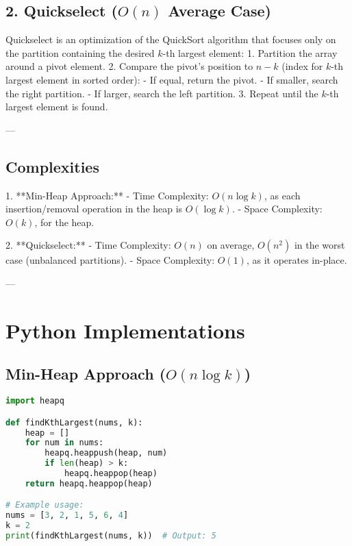 \subsection*{2. Quickselect (\(O(n)\) Average Case)}
Quickselect is an optimization of the QuickSort algorithm that focuses only on the partition containing the desired \(k\)-th largest element:
1. Partition the array around a pivot element.
2. Compare the pivot’s position to \(n-k\) (index for \(k\)-th largest element in sorted order):
    - If equal, return the pivot.
    - If smaller, search the right partition.
    - If larger, search the left partition.
3. Repeat until the \(k\)-th largest element is found.

---

\subsection*{Complexities}
1. **Min-Heap Approach:**
   - Time Complexity: \(O(n \log k)\), as each insertion/removal operation in the heap is \(O(\log k)\).
   - Space Complexity: \(O(k)\), for the heap.

2. **Quickselect:**
   - Time Complexity: \(O(n)\) on average, \(O(n^2)\) in the worst case (unbalanced partitions).
   - Space Complexity: \(O(1)\), as it operates in-place.

---

\section*{Python Implementations}

\subsection*{Min-Heap Approach (\(O(n \log k)\))}
\begin{fullwidth}
\begin{lstlisting}[language=Python]
import heapq

def findKthLargest(nums, k):
    heap = []
    for num in nums:
        heapq.heappush(heap, num)
        if len(heap) > k:
            heapq.heappop(heap)
    return heapq.heappop(heap)

# Example usage:
nums = [3, 2, 1, 5, 6, 4]
k = 2
print(findKthLargest(nums, k))  # Output: 5
\end{lstlisting}
\end{fullwidth}

